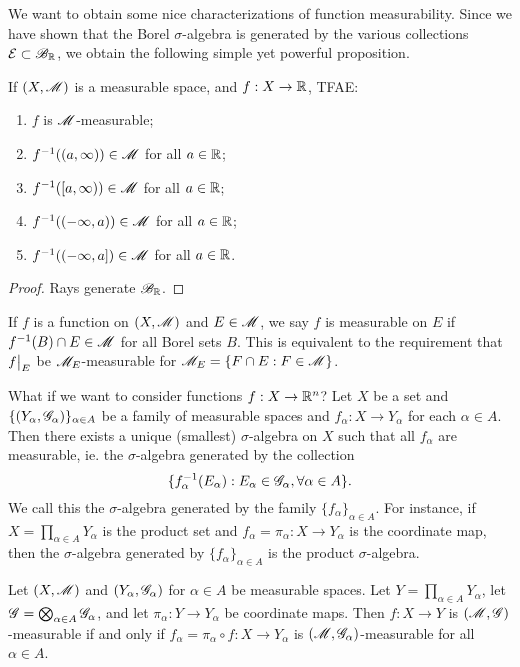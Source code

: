 \documentclass[12pt]{article} %
\begin{document}
We want to obtain some nice characterizations of function measurability. Since we have shown that the Borel $\sigma$-algebra is generated by the various collections $\mathcal{E} \subset \mathscr{B}_{\mathbb{R}}$, we obtain the following simple yet powerful proposition.

\begin{proposition}\label{prop:measurable-function-elementary-test}
    If $(X, \mathscr{M})$ is a measurable space, and $f : X \to \mathbb{R}$, TFAE: \begin{enumerate}
        \item $f$ is $\mathscr{M}$-measurable;
        \item $f^{-1}((a, \infty)) \in \mathscr{M}$ for all $a \in \mathbb{R}$;
        \item $f^{-1}([a, \infty)) \in \mathscr{M}$ for all $a \in \mathbb{R}$;
        \item $f^{-1}((-\infty, a)) \in \mathscr{M}$ for all $a \in \mathbb{R}$;
        \item $f^{-1}((-\infty, a]) \in \mathscr{M}$ for all $a \in \mathbb{R}$.
    \end{enumerate}
\end{proposition}

\begin{proof}
    Rays generate $\mathscr{B}_{\mathbb{R}}$.
\end{proof}

\begin{definition}
    If $f$ is a function on $(X, \mathscr{M})$ and $E \in \mathscr{M}$, we say $f$ is measurable on $E$ if $f^{-1}(B) \cap E \in \mathscr{M}$ for all Borel sets $B$. This is equivalent to the requirement that $\restr{f}{E}$ be $\mathscr{M}_E$-measurable for $\mathscr{M}_E = \{F \cap E : F \in \mathscr{M}\}$.
\end{definition}

What if we want to consider functions $f : X \to \mathbb{R}^n$? Let $X$ be a set and $\{(Y_\alpha, \mathscr{G}_\alpha)\}_{\alpha \in A}$ be a family of measurable spaces and $f_\alpha : X \to Y_\alpha$ for each $\alpha \in A$. Then there exists a unique (smallest) $\sigma$-algebra on $X$ such that all $f_\alpha$ are measurable, ie. the $\sigma$-algebra generated by the collection \[\{f_\alpha^{-1}(E_\alpha) : E_\alpha \in \mathscr{G}_\alpha, \forall \alpha \in A\}.\] We call this the $\sigma$-algebra generated by the family $\{f_\alpha\}_{\alpha \in A}$. For instance, if $X = \prod_{\alpha \in A} Y_\alpha$ is the product set and $f_\alpha = \pi_\alpha : X \to Y_\alpha$ is the coordinate map, then the $\sigma$-algebra generated by $\{f_\alpha\}_{\alpha \in A}$ is the product $\sigma$-algebra.

\begin{proposition}
    Let $(X, \mathscr{M})$ and $(Y_\alpha, \mathscr{G}_\alpha)$ for $\alpha \in A$ be measurable spaces. Let $Y = \prod_{\alpha \in A} Y_\alpha$, let $\mathscr{G} = \bigotimes_{\alpha \in A} \mathscr{G}_\alpha$, and let $\pi_\alpha : Y \to Y_\alpha$ be coordinate maps. Then $f : X \to Y$ is $(\mathscr{M}, \mathscr{G})$-measurable if and only if $f_\alpha = \pi_\alpha \circ f : X \to Y_\alpha$ is $(\mathscr{M}, \mathscr{G}_\alpha)$-measurable for all $\alpha \in A$.
\end{proposition}
\end{document}
